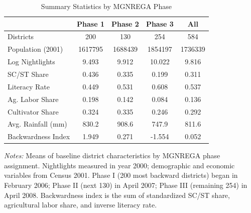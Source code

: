 \begin{table}[htbp]
\centering
\caption{Summary Statistics by MGNREGA Phase}
\label{tab:summary}
\begin{tabular}{lcccc}
\hline\hline
 & Phase 1 & Phase 2 & Phase 3 & All \\
\hline
Districts & 200 & 130 & 254 & 584 \\
Population (2001) & 1617795 & 1688439 & 1854197 & 1736339 \\
Log Nightlights & 9.493 & 9.912 & 10.022 & 9.816 \\
SC/ST Share & 0.436 & 0.335 & 0.199 & 0.311 \\
Literacy Rate & 0.449 & 0.531 & 0.608 & 0.537 \\
Ag. Labor Share & 0.198 & 0.142 & 0.084 & 0.136 \\
Cultivator Share & 0.324 & 0.335 & 0.246 & 0.292 \\
Avg. Rainfall (mm) & 830.2 & 908.6 & 747.9 & 811.6 \\
Backwardness Index & 1.949 & 0.271 & -1.554 & 0.052 \\
\hline\hline
\end{tabular}
\begin{tablenotes}[flushleft]\small
\item \textit{Notes:} Means of baseline district characteristics by MGNREGA phase assignment. Nightlights measured in year 2000; demographic and economic variables from Census 2001. Phase I (200 most backward districts) began in February 2006; Phase II (next 130) in April 2007; Phase III (remaining 254) in April 2008. Backwardness index is the sum of standardized SC/ST share, agricultural labor share, and inverse literacy rate.
\end{tablenotes}
\end{table}
